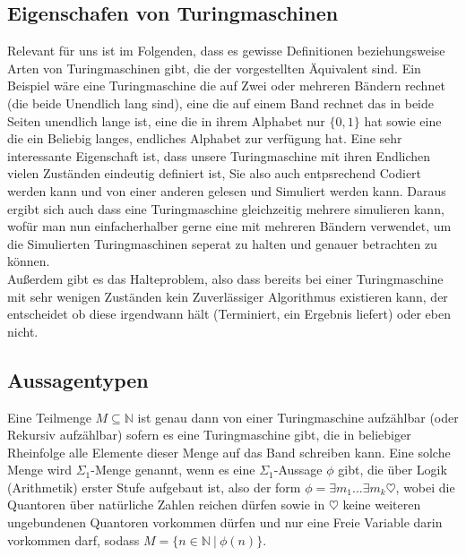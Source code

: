 \documentclass{scrartcl}
\begin{document}
\subsection{Eigenschafen von Turingmaschinen}
Relevant für uns ist im Folgenden, dass es gewisse Definitionen beziehungsweise
Arten von Turingmaschinen gibt, die der vorgestellten Äquivalent sind. Ein
Beispiel wäre eine Turingmaschine die auf Zwei oder mehreren Bändern rechnet
(die beide Unendlich lang sind), eine die auf einem Band rechnet das in beide
Seiten unendlich lange ist, eine die in ihrem Alphabet nur $\{0, 1\}$ hat sowie
eine die ein Beliebig langes, endliches Alphabet zur verfügung hat. Eine sehr
interessante Eigenschaft ist, dass unsere Turingmaschine mit ihren Endlichen
vielen Zuständen eindeutig definiert ist, Sie also auch entpsrechend Codiert
werden kann und von einer anderen gelesen und Simuliert werden kann. Daraus
ergibt sich auch dass eine Turingmaschine gleichzeitig mehrere simulieren kann,
wofür man nun einfacherhalber gerne eine mit mehreren Bändern verwendet, um die
Simulierten Turingmaschinen seperat zu halten und genauer betrachten zu können. \\
Außerdem gibt es das Halteproblem, also dass bereits bei einer Turingmaschine
mit sehr wenigen Zuständen kein Zuverlässiger Algorithmus existieren kann, der
entscheidet ob diese irgendwann hält (Terminiert, ein Ergebnis liefert) oder
eben nicht.


\subsection{Aussagentypen}
Eine Teilmenge $M \subseteq \mathbb{N}$ ist genau dann von einer Turingmaschine
aufzählbar (oder Rekursiv aufzählbar) sofern es eine Turingmaschine gibt, die
in beliebiger Rheinfolge alle Elemente dieser Menge auf das Band schreiben
kann. Eine solche Menge wird $\Sigma_1$-Menge genannt, wenn es eine
$\Sigma_1$-Aussage $\phi$ gibt, die über Logik (Arithmetik) erster Stufe
aufgebaut ist, also der form $\phi = \exists m_1...\exists m_k \heartsuit$,
wobei die Quantoren über natürliche Zahlen reichen dürfen sowie in $\heartsuit$
keine weiteren ungebundenen Quantoren vorkommen dürfen und nur eine Freie
Variable darin vorkommen darf, sodass $M = \{n \in \mathbb{N}\ |\ \phi(n)\}$.
\end{document}
